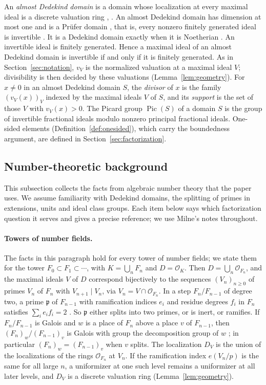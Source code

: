 \documentclass[11pt]{article}
\theoremstyle{plain}
\theoremstyle{definition}
\theoremstyle{remark}
\DeclareMathOperator{\Pic}{Pic}
\newcommand{\OO}{\mathcal O}
\begin{document}
An \emph{almost Dedekind domain} is a domain whose localization at every
maximal ideal is a discrete valuation ring \cite[\S36]{Gilmer},
\cite[Section~2.2]{FHL}.  An almost Dedekind domain has dimension at most
one and is a Prüfer domain \cite[p.~434]{Gilmer}, that is, every nonzero
finitely generated ideal is invertible \cite[Section~2]{CGH}.  It is a
Dedekind domain exactly when it is Noetherian \cite[Section~2]{CGH}.  An
invertible ideal is finitely generated.  Hence a maximal ideal of an
almost Dedekind domain is invertible if and only if it is finitely
generated.  As in Section~\ref{sec:notation}, $v_V$ is the normalized
valuation at a maximal ideal $V$; divisibility is then decided by these
valuations (Lemma~\ref{lem:geometry}).  For $x\ne0$ in an almost Dedekind
domain $S$, the \emph{divisor} of $x$ is the family $(v_V(x))_V$ indexed
by the maximal ideals $V$ of $S$, and its \emph{support} is the set of
those $V$ with $v_V(x)>0$.  The Picard group
$\Pic(S)$ of a domain $S$ is the group of invertible fractional ideals
modulo nonzero principal fractional ideals.  One-sided elements
(Definition~\ref{def:onesided}), which carry the boundedness argument, are
defined in Section~\ref{sec:factorization}.

\subsection{Number-theoretic background}\label{sec:nt-background}

This subsection collects the facts from algebraic number theory that the
paper uses.  We assume familiarity with Dedekind domains, the splitting of
primes in extensions, units and ideal class groups.  Each item below says
which factorization question it serves and gives a precise reference; we
use Milne's notes \cite{MilneANT,MilneCFT} throughout.

\paragraph{Towers of number fields.}  The facts in this paragraph hold for
every tower of number fields; we state them for the tower
$F_0\subset F_1\subset\cdots$, with $K=\bigcup_nF_n$ and $D=\OO_K$.  Then
$D=\bigcup_n\OO_{F_n}$, and the maximal ideals $V$ of $D$ correspond
bijectively to the sequences $(V_n)_{n\ge0}$ of primes $V_n$ of $F_n$ with
$V_{n+1}\mid V_n$, via $V_n=V\cap\OO_{F_n}$.  In a step $F_n/F_{n-1}$ of
degree two, a prime $\mathfrak p$ of $F_{n-1}$ with ramification indices
$e_i$ and residue degrees $f_i$ in $F_n$ satisfies $\sum_ie_if_i=2$
\cite[Theorem~3.34]{MilneANT}.  So $\mathfrak p$ either splits into two
primes, or is inert, or ramifies.  If $F_n/F_{n-1}$ is Galois and $w$ is a
place of $F_n$ above a place $v$ of $F_{n-1}$, then $(F_n)_w/(F_{n-1})_v$ is
Galois with group the decomposition group of $w$
\cite[Proposition~8.10]{MilneANT}; in particular $(F_n)_w=(F_{n-1})_v$ when
$v$ splits.  The localization $D_V$ is the union of the localizations of
the rings $\OO_{F_n}$ at $V_n$.  If the ramification index $e(V_n/p)$ is
the same for all large $n$, a uniformizer at one such level remains a
uniformizer at all later levels, and $D_V$ is a discrete valuation ring
(Lemma~\ref{lem:geometry}).
\end{document}
